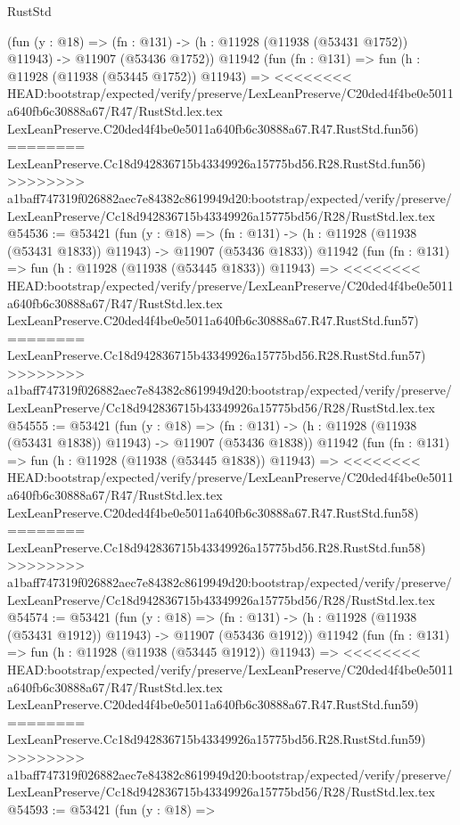 \begin{lexlean}{RustStd}
\begin{coremodule}
{\begin{coremodule}
{{{{{{{{{{{{{{{{{{{{{{{{{{{{{{{{{{{{{{{{{{{{{{{{{{{{{{{{{{{{{{{{{{{{{{{{{{{{{{{{    (fun (y : @18) =>
    (fn : @131) -> (h : @11928 (@11938 (@53431 @1752)) @11943) -> @11907 (@53436 @1752))
    @11942
    (fun (fn : @131) =>
    fun (h : @11928 (@11938 (@53445 @1752)) @11943) =>
<<<<<<<< HEAD:bootstrap/expected/verify/preserve/LexLeanPreserve/C20ded4f4be0e5011a640fb6c30888a67/R47/RustStd.lex.tex
    LexLeanPreserve.C20ded4f4be0e5011a640fb6c30888a67.R47.RustStd.fun56)
========
    LexLeanPreserve.Cc18d942836715b43349926a15775bd56.R28.RustStd.fun56)
>>>>>>>> a1baff747319f026882aec7e84382c8619949d20:bootstrap/expected/verify/preserve/LexLeanPreserve/Cc18d942836715b43349926a15775bd56/R28/RustStd.lex.tex
@54536 := @53421
    (fun (y : @18) =>
    (fn : @131) -> (h : @11928 (@11938 (@53431 @1833)) @11943) -> @11907 (@53436 @1833))
    @11942
    (fun (fn : @131) =>
    fun (h : @11928 (@11938 (@53445 @1833)) @11943) =>
<<<<<<<< HEAD:bootstrap/expected/verify/preserve/LexLeanPreserve/C20ded4f4be0e5011a640fb6c30888a67/R47/RustStd.lex.tex
    LexLeanPreserve.C20ded4f4be0e5011a640fb6c30888a67.R47.RustStd.fun57)
========
    LexLeanPreserve.Cc18d942836715b43349926a15775bd56.R28.RustStd.fun57)
>>>>>>>> a1baff747319f026882aec7e84382c8619949d20:bootstrap/expected/verify/preserve/LexLeanPreserve/Cc18d942836715b43349926a15775bd56/R28/RustStd.lex.tex
@54555 := @53421
    (fun (y : @18) =>
    (fn : @131) -> (h : @11928 (@11938 (@53431 @1838)) @11943) -> @11907 (@53436 @1838))
    @11942
    (fun (fn : @131) =>
    fun (h : @11928 (@11938 (@53445 @1838)) @11943) =>
<<<<<<<< HEAD:bootstrap/expected/verify/preserve/LexLeanPreserve/C20ded4f4be0e5011a640fb6c30888a67/R47/RustStd.lex.tex
    LexLeanPreserve.C20ded4f4be0e5011a640fb6c30888a67.R47.RustStd.fun58)
========
    LexLeanPreserve.Cc18d942836715b43349926a15775bd56.R28.RustStd.fun58)
>>>>>>>> a1baff747319f026882aec7e84382c8619949d20:bootstrap/expected/verify/preserve/LexLeanPreserve/Cc18d942836715b43349926a15775bd56/R28/RustStd.lex.tex
@54574 := @53421
    (fun (y : @18) =>
    (fn : @131) -> (h : @11928 (@11938 (@53431 @1912)) @11943) -> @11907 (@53436 @1912))
    @11942
    (fun (fn : @131) =>
    fun (h : @11928 (@11938 (@53445 @1912)) @11943) =>
<<<<<<<< HEAD:bootstrap/expected/verify/preserve/LexLeanPreserve/C20ded4f4be0e5011a640fb6c30888a67/R47/RustStd.lex.tex
    LexLeanPreserve.C20ded4f4be0e5011a640fb6c30888a67.R47.RustStd.fun59)
========
    LexLeanPreserve.Cc18d942836715b43349926a15775bd56.R28.RustStd.fun59)
>>>>>>>> a1baff747319f026882aec7e84382c8619949d20:bootstrap/expected/verify/preserve/LexLeanPreserve/Cc18d942836715b43349926a15775bd56/R28/RustStd.lex.tex
@54593 := @53421
    (fun (y : @18) =>
}}}}}}}}}}}}}}}}}}}}}}}}}}}}}}}}}}}}}}}}}}}}}}}}}}}}}}}}}}}}}}}}}}}}}}}}}}}}}}}}
\end{coremodule}}
\end{coremodule}
\end{lexlean}
